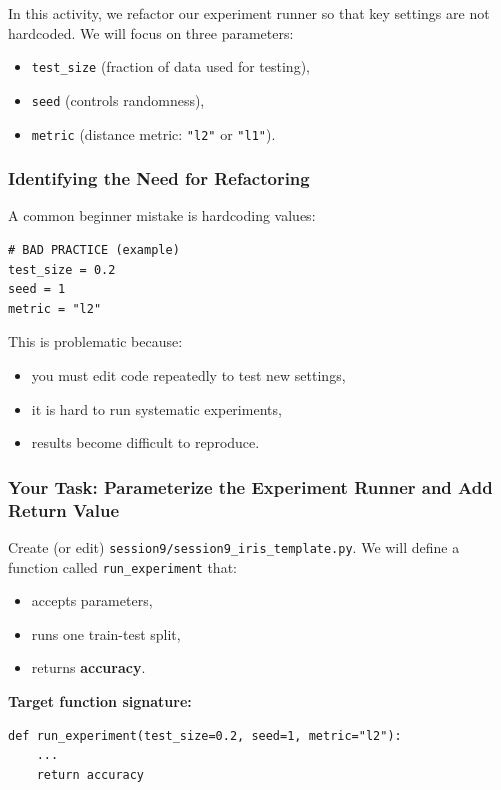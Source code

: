 In this activity, we refactor our experiment runner so that key settings are not hardcoded.
We will focus on three parameters:
\begin{itemize}\setlength{\itemsep}{0pt}
\item \texttt{test\_size} (fraction of data used for testing),
\item \texttt{seed} (controls randomness),
\item \texttt{metric} (distance metric: \texttt{"l2"} or \texttt{"l1"}).
\end{itemize}

\subsubsection{Identifying the Need for Refactoring}

A common beginner mistake is hardcoding values:
\begin{verbatim}
# BAD PRACTICE (example)
test_size = 0.2
seed = 1
metric = "l2"
\end{verbatim}

\noindent
This is problematic because:
\begin{itemize}\setlength{\itemsep}{0pt}
\item you must edit code repeatedly to test new settings,
\item it is hard to run systematic experiments,
\item results become difficult to reproduce.
\end{itemize}

\subsubsection{Your Task: Parameterize the Experiment Runner and Add Return Value}
\label{subsubsec:activity_parametrize_main}

Create (or edit) \texttt{session9/session9\_iris\_template.py}. We will define a function called \texttt{run\_experiment} that:
\begin{itemize}\setlength{\itemsep}{0pt}
\item accepts parameters,
\item runs one train-test split,
\item returns \textbf{accuracy}.
\end{itemize}

\noindent
\textbf{Target function signature:}
\begin{verbatim}
def run_experiment(test_size=0.2, seed=1, metric="l2"):
    ...
    return accuracy
\end{verbatim}

